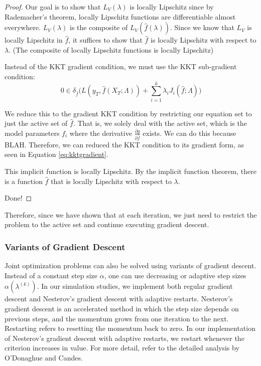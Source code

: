 \documentclass[10pt,letterpaper]{article}
\begin{document}
\begin{proof}

Our goal is to show that $L_V(\lambda)$ is locally Lipschitz since by Rademacher's theorem, locally Lipschitz functions are differentiable almost everywhere. $L_V(\lambda)$ is the composite of $L_V(\hat f(\lambda))$. Since we know that $L_V$ is locally Lipschitz in $\hat f$, it suffices to show that $\hat f$ is locally Lipschitz with respect to $\lambda$. (The composite of locally Lipschitz functions is locally Lipschitz)

Instead of the KKT gradient condition, we must use the KKT sub-gradient condition:
\begin{equation}
0 \in \delta_{\hat f} \big (L(y_T, \hat f (X_T; \Lambda)) + \sum\limits_{i=1}^k \lambda_i J_i(\hat f; \Lambda) \big)
\end{equation}

We reduce this to the gradient KKT condition by restricting our equation set to just the active set of $\hat f$. That is, we solely deal with the active set, which is the model parameters $f_i$ where the derivative $\frac{\partial g}{\partial \hat f}$ exists. We can do this because BLAH. Therefore, we can reduced the KKT condition to its gradient form, as seen in Equation \ref{eq:kktgradient}.

This implicit function is locally Lipschitz. By the implicit function theorem, there is a function $\hat f$ that is locally Lipschitz with respect to $\lambda$.

Done!

\end{proof}

Therefore, since we have shown that at each iteration, we just need to restrict the problem to the active set and continue executing gradient descent.

\subsubsection{Variants of Gradient Descent}

Joint optimization problems can also be solved using variants of gradient descent. Instead of a constant step size $\alpha$, one can use decreasing or adaptive step sizes $\alpha(\lambda^{(k)})$. In our simulation studies, we implement both regular gradient descent and Nesterov's gradient descent with adaptive restarts. Nesterov's gradient descent is an accelerated method in which the step size depends on previous steps, and the momentum grows from one iteration to the next. Restarting refers to resetting the momentum back to zero. In our implementation of Nesterov's gradient descent with adaptive restarts, we restart whenever the criterion increases in value. For more detail, refer to the detailed analysis by O'Donaghue and Candes.
\end{document}

